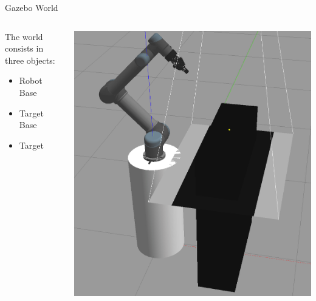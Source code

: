 \begin{frame}{Gazebo World}
    \begin{columns}
        \begin{column}{.5\linewidth}
            The world consists in three objects:
            \begin{itemize}
                \item Robot Base
                \item Target Base
                \item Target
            \end{itemize}
        \end{column}
        \begin{column}{.5\linewidth}
            \begin{center}
                \includegraphics[width=.75\textwidth]{media/GazeboWorld.png}
            \end{center}
        \end{column}
    \end{columns}
\end{frame}
